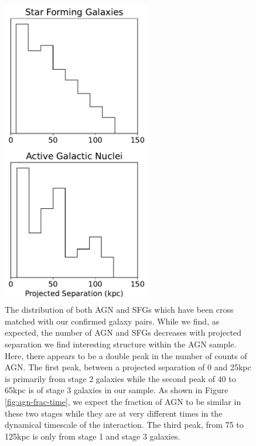 \begin{figure}
    \centering
    \includegraphics[width=0.58\textwidth]{Chapter3/figures/sfg-agn-dist.pdf}
    \caption{The distribution of both AGN and SFGs which have been cross matched with our confirmed galaxy pairs. While we find, as expected, the number of AGN and SFGs decreases with projected separation we find interesting structure within the AGN sample. Here, there appears to be a double peak in the number of counts of AGN. The first peak, between a projected separation of 0 and 25kpc is primarily from stage 2 galaxies while the second peak of 40 to 65kpc is of stage 3 galaxies in our sample. As shown in Figure \ref{fig:agn-frac-time}, we expect the fraction of AGN to be similar in these two stages while they are at very different times in the dynamical timescale of the interaction. The third peak, from 75 to 125kpc is only from stage 1 and stage 3 galaxies.}
    \label{fig:sfg-agn-proj}
\end{figure}

